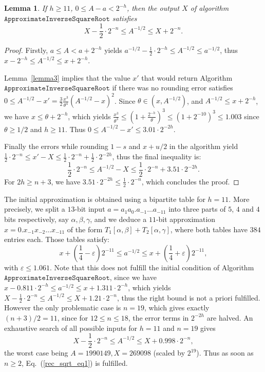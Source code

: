 \documentclass[12pt]{amsart}
\newtheorem{lemma}{Lemma}
\begin{document}
\begin{lemma} \label{lemma_recsqrt}
If $h \geq 11$, $0 \leq A - a < 2^{-h}$, then the output $X$ of algorithm
$\texttt{ApproximateInverseSquareRoot}$ satisfies
\begin{equation} \label{rec_sqrt_eq1}
X - \frac{1}{2} \cdot 2^{-n} \leq A^{-1/2} \leq X + 2^{-n}.
\end{equation}
\end{lemma}
\begin{proof}
Firstly, $a \leq A < a+2^{-h}$ yields
$a^{-1/2} - \frac{1}{2} \cdot 2^{-h} \leq A^{-1/2} \leq a^{-1/2}$,
thus $x - 2^{-h} \leq A^{-1/2} \leq x + 2^{-h}$.

Lemma~\ref{lemma3} implies that the value $x'$ that would return
Algorithm $\texttt{ApproximateInverseSquareRoot}$ if there was no rounding
error satisfies $0 \leq A^{-1/2} - x' = \frac{3}{2} \frac{x^3}{\theta^4} 
(A^{-1/2}-x)^2$. Since $\theta \in (x, A^{-1/2})$, and
$A^{-1/2} \leq x + 2^{-h}$, we have $x \leq \theta + 2^{-h}$,
which yields $\frac{x^3}{\theta^3} \leq (1 + \frac{2^{-h}}{\theta})^3
\leq (1 + 2^{-10})^3 \leq 1.003$ since $\theta \geq 1/2$ and $h \geq 11$.
Thus $0 \leq A^{-1/2} - x' \leq 3.01 \cdot 2^{-2h}$.

Finally the errors while rounding $1-s$ and $x+u/2$ in the algorithm 
yield $\frac{1}{2} \cdot 2^{-n} \leq x' - X \leq \frac{1}{2} \cdot 2^{-n}
+ \frac{1}{2} \cdot 2^{-2h}$, thus the final inequality is:
\[ \frac{1}{2} \cdot 2^{-n} \leq A^{-1/2} - X \leq 
\frac{1}{2} \cdot 2^{-n} + 3.51 \cdot 2^{-2h}. \]
For $2h \geq n+3$, we have $3.51 \cdot 2^{-2h} \leq \frac{1}{2} \cdot 2^{-n}$,
which concludes the proof.
\end{proof}

The initial approximation is obtained using a bipartite table for $h=11$.
More precisely, we split a $13$-bit input $a = a_1 a_0. a_{-1} \ldots a_{-11}$
into three parts of $5$, $4$ and $4$ bits respectively, say $\alpha,
\beta, \gamma$, and we deduce a $11$-bit approximation
$x = 0.x_{-1} x_{-2} \ldots x_{-11}$ of the form
$T_1[\alpha, \beta] + T_2[\alpha,\gamma]$, where both tables have $384$
entries each.
Those tables satisfy:
\[ x + (\frac{1}{4} - \varepsilon) 2^{-11} \leq a^{-1/2} \leq
   x + (\frac{1}{4} + \varepsilon) 2^{-11}, \]
with $\varepsilon \leq 1.061$.
Note that this does not fulfill the initial condition of
Algorithm $\texttt{ApproximateInverseSquareRoot}$, since
we have $x - 0.811 \cdot 2^{-h} \leq a^{-1/2} \leq x + 1.311 \cdot 2^{-h}$,
which yields $X - \frac{1}{2} \cdot 2^{-n} \leq A^{-1/2} \leq
              X + 1.21 \cdot 2^{-n}$,
thus the right bound is not a priori fulfilled.
However the only problematic case is $n=19$, which gives exactly
$(n+3)/2 = 11$, since for $12 \leq n \leq 18$,
the error terms in $2^{-2h}$ are halved.
An exhaustive search of all possible inputs for $h=11$ and $n=19$ gives
\[ X - \frac{1}{2} \cdot 2^{-n} \leq A^{-1/2} \leq X + 0.998 \cdot 2^{-n},\]
the worst case being $A=1990149, X=269098$ (scaled by $2^{19}$).
Thus as soon as $n \geq 2$, Eq.~(\ref{rec_sqrt_eq1}) is fulfilled.
\end{document}
